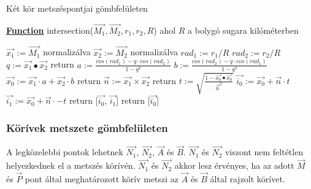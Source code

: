 \begin{algorithm}[H]
	\caption{Két kör metszéspontjai gömbfelületen}
	\label{alg:intersection}
	\textbf{\underline{Function}} intersection($\overrightarrow{M_1}, \overrightarrow{M_2}, r_1, r_2, R$) ahol $R$ a bolygó sugara kilóméterben
	\begin{algorithmic}[1]
	\STATE $\overrightarrow{x_1} := \overrightarrow{M_1}$ normalizálva 
	\STATE $\overrightarrow{x_2} := \overrightarrow{M_2}$ normalizálva
	\STATE $rad_1 := r_1 / R$ 
	\STATE $rad_2 := r_2 / R$
	\STATE $q := \overrightarrow{x_1} \bullet \overrightarrow{x_2}$ 
		\STATE return 
	\ENDIF
	\STATE $a := \frac{cos(rad_1) - q \cdot cos(rad_2)}{1 - q^2}$
	\STATE $b := \frac{cos(rad_2) - q \cdot cos(rad_1)}{1 - q^2}$
	\STATE $\overrightarrow{x_0} := \overrightarrow{x_1} \cdot a + \overrightarrow{x_2} \cdot b$
		\STATE return 
	\ENDIF
	\STATE $\overrightarrow{n} := \overrightarrow{x_1} × \overrightarrow{x_2}$
		\STATE return 
	\ENDIF
	\STATE $t := \sqrt{ \frac{1 - \overrightarrow{x_0} \bullet \overrightarrow{x_0}}{\overrightarrow{n}^2}}$
	\STATE $\overrightarrow{i_0} := \overrightarrow{x_0} + \overrightarrow{n} \cdot t$
		\STATE $\overrightarrow{i_1} := \overrightarrow{x_0} + \overrightarrow{n} \cdot -t$
		\STATE return [$\overrightarrow{i_0}$, $\overrightarrow{i_1}$]
	\ELSE
		\STATE return [$\overrightarrow{i_0}$]
	\ENDIF
	\end{algorithmic}
\end{algorithm}

\subsubsection{Körívek metszete gömbfelületen}

A legközelebbi pontok lehetnek $\overrightarrow{N_1}$, $\overrightarrow{N_2}$, $\overrightarrow{A}$ és $\overrightarrow{B}$. $\overrightarrow{N_1}$ és $\overrightarrow{N_2}$ viszont nem feltétlen helyezkednek el a metszés körívén. $\overrightarrow{N_1}$ és $\overrightarrow{N_2}$ akkor lesz érvényes, ha az adott $\overrightarrow{M}$ és $\overrightarrow{P}$ pont által meghatározott körív metszi az $\overrightarrow{A}$ és $\overrightarrow{B}$ által rajzolt körívet.

